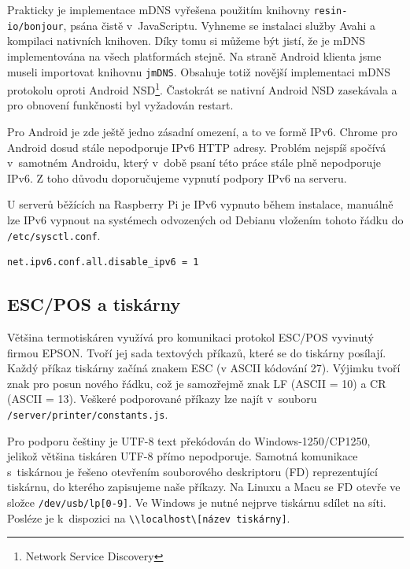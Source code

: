 \documentclass[a4paper,11pt,oneside]{article}
\begin{document}
Prakticky je implementace mDNS vyřešena použitím knihovny \lstinline|resin-io/bonjour|, psána čistě v~JavaScriptu. Vyhneme se instalaci služby Avahi a kompilaci nativních knihoven. Díky tomu si můžeme být jistí, že je mDNS implementována na všech platformách stejně. 
Na straně Android klienta jsme museli importovat knihovnu \lstinline|jmDNS|. Obsahuje totiž novější implementaci mDNS protokolu oproti Android NSD\footnote{Network Service Discovery}. Častokrát se nativní Android NSD zasekávala a pro obnovení funkčnosti byl vyžadován restart. 

Pro Android je zde ještě jedno zásadní omezení, a to ve formě IPv6. Chrome pro Android dosud stále nepodporuje IPv6 HTTP adresy. Problém nejspíš spočívá v~samotném Androidu, který v~době psaní této práce stále plně nepodporuje IPv6\cite{ipv6bug}. Z toho důvodu doporučujeme vypnutí podpory IPv6 na serveru.

U serverů běžících na Raspberry Pi je IPv6 vypnuto během instalace, manuálně lze IPv6 vypnout na systémech odvozených od Debianu vložením tohoto řádku do \lstinline|/etc/sysctl.conf|.

\begin{lstlisting}[language=bash, caption={sysctl.conf}]
net.ipv6.conf.all.disable_ipv6 = 1
\end{lstlisting}

\subsection{ESC/POS a tiskárny}

Většina termotiskáren využívá pro komunikaci protokol ESC/POS vyvinutý firmou EPSON. Tvoří jej sada textových příkazů, které se do tiskárny posílají. Každý příkaz tiskárny začíná znakem ESC (v ASCII kódování 27). Výjimku tvoří znak pro posun nového řádku, což je samozřejmě znak LF (ASCII = 10) a CR (ASCII = 13). Veškeré podporované příkazy lze najít v~souboru \lstinline|/server/printer/constants.js|. 

Pro podporu češtiny je UTF-8 text překódován do Windows-1250/CP1250, jelikož většina tiskáren UTF-8 přímo nepodporuje. Samotná komunikace s~tiskárnou je řešeno otevřením souborového deskriptoru (FD) reprezentující tiskárnu, do kterého zapisujeme naše příkazy. Na Linuxu a Macu se FD otevře ve složce \lstinline|/dev/usb/lp[0-9]|. Ve Windows je nutné nejprve tiskárnu sdílet na síti. Posléze je k~dispozici na \lstinline|\\localhost\[název tiskárny]|.
\end{document}
